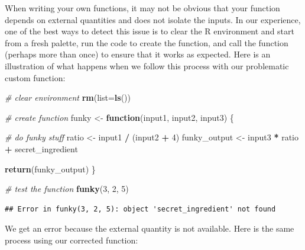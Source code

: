 \documentclass[
]{book}
\newenvironment{Shaded}{\begin{snugshade}}{\end{snugshade}}
\newcommand{\AttributeTok}[1]{\textcolor[rgb]{0.13,0.29,0.53}{#1}}
\newcommand{\CommentTok}[1]{\textcolor[rgb]{0.56,0.35,0.01}{\textit{#1}}}
\newcommand{\ControlFlowTok}[1]{\textcolor[rgb]{0.13,0.29,0.53}{\textbf{#1}}}
\newcommand{\DecValTok}[1]{\textcolor[rgb]{0.00,0.00,0.81}{#1}}
\newcommand{\FunctionTok}[1]{\textcolor[rgb]{0.13,0.29,0.53}{\textbf{#1}}}
\newcommand{\NormalTok}[1]{#1}
\newcommand{\OtherTok}[1]{\textcolor[rgb]{0.56,0.35,0.01}{#1}}
\newcommand{\SpecialCharTok}[1]{\textcolor[rgb]{0.81,0.36,0.00}{\textbf{#1}}}
\begin{document}
When writing your own functions, it may not be obvious that your function depends on external quantities and does not isolate the inputs.
In our experience, one of the best ways to detect this issue is to clear the R environment and start from a fresh palette, run the code to create the function, and call the function (perhaps more than once) to ensure that it works as expected.
Here is an illustration of what happens when we follow this process with our problematic custom function:

\begin{Shaded}
\begin{Highlighting}[]
\CommentTok{\# clear environment}
\FunctionTok{rm}\NormalTok{(}\AttributeTok{list=}\FunctionTok{ls}\NormalTok{()) }

\CommentTok{\# create function}
\NormalTok{funky }\OtherTok{\textless{}{-}} \ControlFlowTok{function}\NormalTok{(input1, input2, input3) \{}
  
  \CommentTok{\# do funky stuff}
\NormalTok{  ratio }\OtherTok{\textless{}{-}}\NormalTok{ input1 }\SpecialCharTok{/}\NormalTok{ (input2 }\SpecialCharTok{+} \DecValTok{4}\NormalTok{)}
\NormalTok{  funky\_output }\OtherTok{\textless{}{-}}\NormalTok{ input3 }\SpecialCharTok{*}\NormalTok{ ratio }\SpecialCharTok{+}\NormalTok{ secret\_ingredient}
  
  \FunctionTok{return}\NormalTok{(funky\_output)  }
\NormalTok{\}}

\CommentTok{\# test the function}
\FunctionTok{funky}\NormalTok{(}\DecValTok{3}\NormalTok{, }\DecValTok{2}\NormalTok{, }\DecValTok{5}\NormalTok{)}
\end{Highlighting}
\end{Shaded}

\begin{verbatim}
## Error in funky(3, 2, 5): object 'secret_ingredient' not found
\end{verbatim}

We get an error because the external quantity is not available.
Here is the same process using our corrected function:
\end{document}
